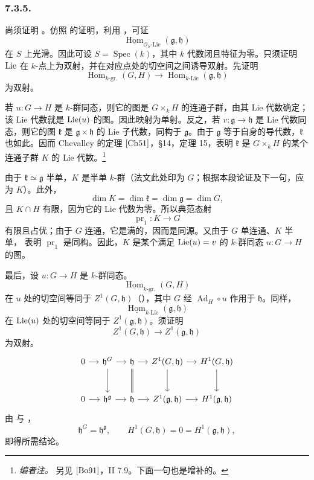 \subsubsection*{7.3.5.}
尚须证明 。仿照  的证明，利用 ，可证
\[
  \underline{\operatorname{Hom}}_{\mathcal O_S\text{-}\mathrm{Lie}}
    (\mathfrak g,\mathfrak h)
\]
在 \(S\) 上光滑。因此可设 \(S=\operatorname{Spec}(k)\)，其中 \(k\) 代数闭且特征为零。只须证明 \(\operatorname{Lie}\) 在 \(k\)-点上为双射，并在对应点处的切空间之间诱导双射。先证明
\[
  \operatorname{Hom}_{k\text{-}\mathrm{gr.}}(G,H)
  \longrightarrow
  \operatorname{Hom}_{k\text{-}\mathrm{Lie}}
    (\mathfrak g,\mathfrak h)
\]
为双射。

若 \(u:G\to H\) 是 \(k\)-群同态，则它的图是 \(G\times_k H\) 的连通子群，由其 Lie 代数确定；该 Lie 代数就是 \(\operatorname{Lie}(u)\) 的图。因此映射为单射。反之，若 \(v:\mathfrak g\to\mathfrak h\) 是 Lie 代数同态，则它的图 \(\mathfrak k\) 是 \(\mathfrak g\times\mathfrak h\) 的 Lie 子代数，同构于 \(\mathfrak g\)。由于 \(\mathfrak g\) 等于自身的导代数，\(\mathfrak k\) 也如此。因而 Chevalley 的定理 \([{\rm Ch51}]\)，\S14，定理 15，表明 \(\mathfrak k\) 是 \(G\times_k H\) 的某个连通子群 \(K\) 的 Lie 代数。\footnote{\textit{编者注。} 另见 \([{\rm Bo91}]\)，II 7.9。下面一句也是增补的。}

由于 \(\mathfrak k\simeq\mathfrak g\) 半单，\(K\) 是半单 \(k\)-群（法文此处印为 \(G\)；根据本段论证及下一句，应为 \(K\)）。此外，
\[
  \dim K=\dim\mathfrak k=\dim\mathfrak g=\dim G,
\]
且 \(K\cap H\) 有限，因为它的 Lie 代数为零。所以典范态射
\[
  \operatorname{pr}_1:K\longrightarrow G
\]
有限且占优；由于 \(G\) 连通，它是满的，因而是同源。又由于 \(G\) 单连通、\(K\) 半单， 表明 \(\operatorname{pr}_1\) 是同构。因此，\(K\) 是某个满足 \(\operatorname{Lie}(u)=v\) 的 \(k\)-群同态 \(u:G\to H\) 的图。

最后，设 \(u:G\to H\) 是 \(k\)-群同态。
\[
  \underline{\operatorname{Hom}}_{k\text{-}\mathrm{gr.}}(G,H)
\]
在 \(u\) 处的切空间等同于 \(Z^1(G,\mathfrak h)\)（），其中 \(G\) 经 \(\operatorname{Ad}_H\circ u\) 作用于 \(\mathfrak h\)。同样，
\[
  \underline{\operatorname{Hom}}_{k\text{-}\mathrm{Lie}}
    (\mathfrak g,\mathfrak h)
\]
在 \(\operatorname{Lie}(u)\) 处的切空间等同于 \(Z^1(\mathfrak g,\mathfrak h)\)。须证明
\[
  Z^1(G,\mathfrak h)\longrightarrow
  Z^1(\mathfrak g,\mathfrak h)
\]
为双射。
\[
\begin{tikzcd}[column sep=small,row sep=large]
0 \arrow[r]
&
\mathfrak h^G
  \arrow[r]
  \arrow[d]
&
\mathfrak h
  \arrow[r]
  \arrow[d,equal]
&
Z^1(G,\mathfrak h)
  \arrow[r]
  \arrow[d]
&
H^1(G,\mathfrak h)
  \arrow[d]
\\
0 \arrow[r]
&
\mathfrak h^{\mathfrak g}
  \arrow[r]
&
\mathfrak h
  \arrow[r]
&
Z^1(\mathfrak g,\mathfrak h)
  \arrow[r]
&
H^1(\mathfrak g,\mathfrak h)
\end{tikzcd}
\]
由  与 ，
\[
  \mathfrak h^G=\mathfrak h^{\mathfrak g},
  \qquad
  H^1(G,\mathfrak h)=0=H^1(\mathfrak g,\mathfrak h),
\]
即得所需结论。

